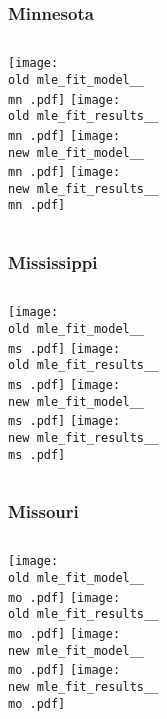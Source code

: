 \documentclass{beamer}
\newcommand{\old}{api-370-prod/pyseir/state_summaries/reports/}
\newcommand{\new}{new/pyseir/state_summaries/reports/}
\newcommand{\mn}{Minnesota__27}
\newcommand{\ms}{Mississippi__28}
\newcommand{\mo}{Missouri__29}
\begin{document}
\begin{frame}
\frametitle{Minnesota}
    \begin{columns}[t]

       \texttt{[image: \\old mle\_fit\_model\_\_\\mn .pdf]}
       \texttt{[image: \\old mle\_fit\_results\_\_\\mn .pdf]}   
       \texttt{[image: \\new mle\_fit\_model\_\_\\mn .pdf]}
       \texttt{[image: \\new mle\_fit\_results\_\_\\mn .pdf]}   
\end{columns}
\end{frame}

\begin{frame}
\frametitle{Mississippi}
    \begin{columns}[t]

       \texttt{[image: \\old mle\_fit\_model\_\_\\ms .pdf]}
       \texttt{[image: \\old mle\_fit\_results\_\_\\ms .pdf]}   
       \texttt{[image: \\new mle\_fit\_model\_\_\\ms .pdf]}
       \texttt{[image: \\new mle\_fit\_results\_\_\\ms .pdf]}   
\end{columns}
\end{frame}

\begin{frame}
\frametitle{Missouri}
    \begin{columns}[t]

       \texttt{[image: \\old mle\_fit\_model\_\_\\mo .pdf]}
       \texttt{[image: \\old mle\_fit\_results\_\_\\mo .pdf]}   
       \texttt{[image: \\new mle\_fit\_model\_\_\\mo .pdf]}
       \texttt{[image: \\new mle\_fit\_results\_\_\\mo .pdf]}   
\end{columns}
\end{frame}
\end{document}
